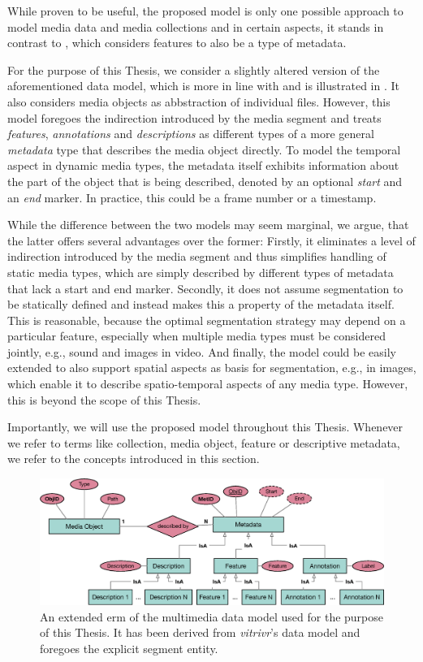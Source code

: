 While proven to be useful, the proposed model is only one possible approach to model media data and media collections and in  certain aspects, it stands in contrast to \cite{Blanken:2007multimedia}, which considers features to also be a type of metadata. 

For the purpose of this Thesis, we consider a slightly altered version of the aforementioned data model, which is more in line with \cite{Blanken:2007multimedia} and is illustrated in . It also considers media objects as abbstraction of individual files. However, this model foregoes the indirection introduced by the media segment and treats \emph{features}, \emph{annotations} and \emph{descriptions} as different types of a more general \emph{metadata} type that describes the media object directly. To model the temporal aspect in dynamic media types, the metadata itself exhibits information about the part of the object that is being described, denoted by an optional \emph{start} and an \emph{end} marker. In practice, this could be a frame number or a timestamp.

While the difference between the two models may seem marginal, we argue, that the latter offers several advantages over the former: Firstly, it eliminates a level of indirection introduced by the media segment and thus simplifies handling of static media types, which are simply described by different types of metadata that lack a start and end marker. Secondly, it does not assume segmentation to be statically defined and instead makes this a property of the metadata itself. This is reasonable, because the optimal segmentation strategy may depend on a particular feature, especially when multiple media types must be considered jointly, e.g., sound and images in video. And finally, the model could be easily extended to also support spatial aspects as basis for segmentation, e.g., in images, which enable it to describe spatio-temporal aspects of any media type. However, this is beyond the scope of this Thesis. 

Importantly, we will use the proposed model throughout this Thesis. Whenever we refer to terms like collection, media object, feature or descriptive metadata, we refer to the concepts introduced in this section.

\begin{figure}[bt]
    \centering
    \includegraphics[width=\textwidth]{figures/erm-media-data}
    \caption{An extended \acrshort{erm} of the multimedia data model used for the purpose of this Thesis. It has been derived from \emph{vitrivr}'s data model and foregoes the explicit segment entity.}
    \label{figure:erm_mediadata}
\end{figure}

